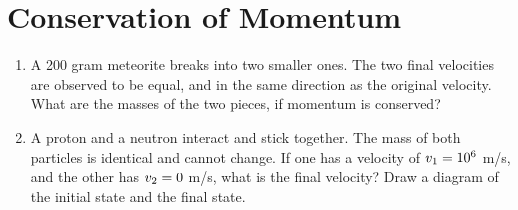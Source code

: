 \documentclass[10pt]{article}
\begin{document}
\section{Conservation of Momentum}
\begin{enumerate}
\item A 200 gram meteorite breaks into two smaller ones.  The two final velocities are observed to be equal, and in the same direction as the original velocity.  What are the masses of the two pieces, if momentum is conserved? \\ \vspace{1.5cm}
\item A proton and a neutron interact and stick together.  The mass of both particles is identical and cannot change.  If one has a velocity of $v_{\rm 1} = 10^{6}$ m/s, and the other has $v_{\rm 2} = 0$ m/s, what is the final velocity?  Draw a diagram of the initial state and the final state.  \\ \vspace{1.5 cm}
\end{enumerate}
\end{document}
